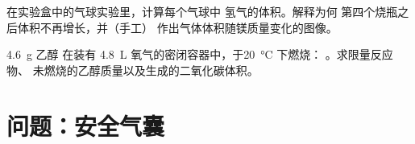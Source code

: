 \begin{exercise}[$\star\star\star$]\label{exo:g10:reaction-progress-table:14}
在实验盒中的气球实验里，计算每个气球中
氢气的体积。解释为何
第四个烧瓶之后体积不再增长，并（手工）
作出气体体积随镁质量变化的图像。
\end{exercise}

\begin{exercise}[$\star\star\star$]\label{exo:g10:reaction-progress-table:15}
\qty{4.6}{g} 乙醇  在装有
\qty{4.8}{L} 氧气的密闭容器中，于\qty{20}{\celsius} 下燃烧：
。求限量反应物、
未燃烧的乙醇质量以及生成的二氧化碳体积。
\end{exercise}

\section{问题：安全气囊}

